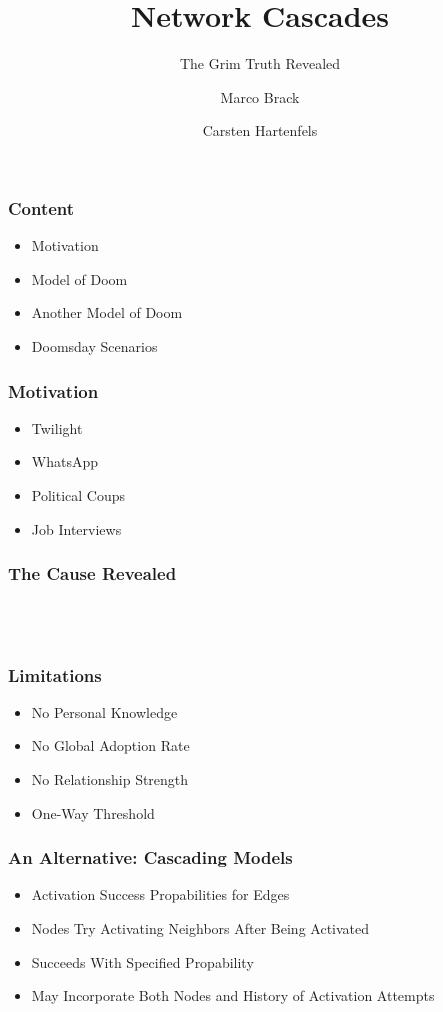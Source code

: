\documentclass[slidestop,usenames,dvipsnames]{beamer}
\title{Network Cascades}
\subtitle{The Grim Truth Revealed}
\author{Marco Brack \and Carsten Hartenfels}
\newcommand{\fitem}{\pause\vfill\item}
\newcommand{\gitem}{\vfill\item}
\begin{document}
\begin{frame}
    \titlepage
\end{frame}




\begin{frame}
    \frametitle{Content}
    \begin{itemize}
        \gitem Motivation
        \gitem Model of Doom
        \gitem Another Model of Doom
        \gitem Doomsday Scenarios
    \end{itemize}
    \vfill
\end{frame}


\begin{frame}
    \frametitle{Motivation}
    \begin{itemize}
        \fitem Twilight
        \fitem WhatsApp
        \fitem Political Coups
        \fitem Job Interviews
    \end{itemize}
    \vfill
\end{frame}

\begin{frame}
    \frametitle{The Cause Revealed}
    \vfill
    \begin{center}
        \\
        \vspace{20pt}
        \\
        \vspace{20pt}
    \end{center}
    \vfill
\end{frame}



\begin{frame}
    \frametitle{Limitations}
    \begin{itemize}
        \fitem No Personal Knowledge
        \fitem No Global Adoption Rate
        \fitem No Relationship Strength
        \fitem One-Way Threshold
    \end{itemize}
    \vfill
\end{frame}

\begin{frame}
    \frametitle{An Alternative: Cascading Models}
    \begin{itemize}
        \fitem Activation Success Propabilities for Edges
        \fitem Nodes Try Activating Neighbors After Being Activated
        \fitem Succeeds With Specified Propability
        \fitem May Incorporate Both Nodes and History of Activation Attempts
    \end{itemize}
    \vfill
\end{frame}
\end{document}
